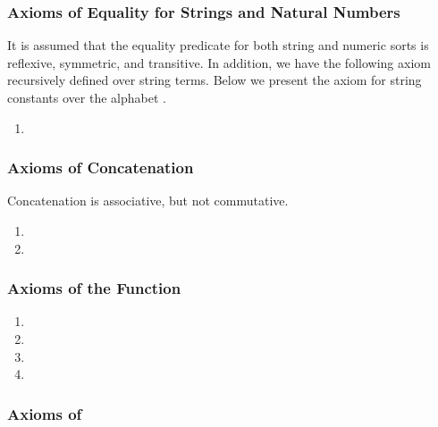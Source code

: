 \subsubsection{Axioms of Equality for Strings and Natural Numbers}

It is assumed that the equality predicate for both string and numeric
sorts is reflexive, symmetric, and transitive. In addition, we have
the following axiom recursively defined over string terms. Below we
present the axiom for string constants over the alphabet .

\begin{enumerate}[resume]

\item 

\end{enumerate}

\subsubsection{Axioms of Concatenation}

Concatenation is associative, but not commutative.

\begin{enumerate}[resume]

\item 

\item 

\end{enumerate}

\subsubsection{Axioms of the  Function}

\begin{enumerate}[resume]

\item 

\item 

\item 

\item 

\end{enumerate}
  
\subsubsection{Axioms of }

